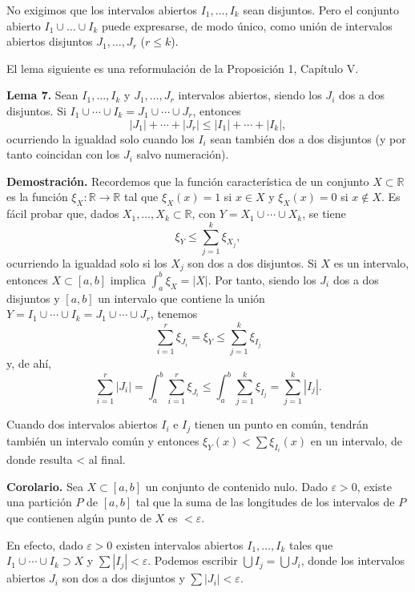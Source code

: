\documentclass[12pt,oneside]{book}
\begin{document}
No exigimos que los intervalos abiertos \(I_1, \dots, I_k\) sean disjuntos. Pero el conjunto abierto \(I_1 \cup \dots \cup I_k\) puede expresarse, de modo único, como unión de intervalos abiertos disjuntos \(J_1, \dots, J_r\) (\(r \le k\)).

El lema siguiente es una reformulación de la Proposición 1, Capítulo V.

\textbf{Lema 7.} Sean \(I_1, \ldots, I_k\) y \(J_1, \ldots, J_r\) intervalos abiertos, siendo los \(J_i\) dos a dos disjuntos. Si \(I_1 \cup \cdots \cup I_k = J_1 \cup \cdots \cup J_r\), entonces
\[
|J_1| + \cdots + |J_r| \leq |I_1| + \cdots + |I_k|,
\]
ocurriendo la igualdad solo cuando los \(I_i\) sean también dos a dos disjuntos (y por tanto coincidan con los \(J_i\) salvo numeración).

\textbf{Demostración.} Recordemos que la función característica de un conjunto \(X \subset \mathbb{R}\) es la función \(\xi_X: \mathbb{R} \to \mathbb{R}\) tal que \(\xi_X(x) = 1\) si \(x \in X\) y \(\xi_X(x) = 0\) si \(x \notin X\). Es fácil probar que, dados \(X_1, \ldots, X_k \subset \mathbb{R}\), con \(Y = X_1 \cup \cdots \cup X_k\), se tiene
\[
\xi_Y \leq \sum_{j=1}^k \xi_{X_j},
\]
ocurriendo la igualdad solo si los \(X_j\) son dos a dos disjuntos. Si \(X\) es un intervalo, entonces \(X \subset [a, b]\) implica \(\int_a^b \xi_X = |X|\). Por tanto, siendo los \(J_i\) dos a dos disjuntos y \([a, b]\) un intervalo que contiene la unión \(Y = I_1 \cup \cdots \cup I_k = J_1 \cup \cdots \cup J_r\), tenemos
\[
\sum_{i=1}^r \xi_{J_i} = \xi_Y \leq \sum_{j=1}^k \xi_{I_j}
\]
y, de ahí,
\[
\sum_{i=1}^r |J_i| = \int_a^b \sum_{i=1}^r \xi_{J_i}
\leq \int_a^b \sum_{j=1}^k \xi_{I_j}
= \sum_{j=1}^k |I_j|.
\]

Cuando dos intervalos abiertos \(I_i\) e \(I_j\) tienen un punto en común, tendrán también un intervalo común y entonces \(\xi_Y(x) < \sum \xi_{I_i}(x)\) en un intervalo, de donde resulta < al final.

\textbf{Corolario.} Sea \(X \subset [a, b]\) un conjunto de contenido nulo. Dado \(\varepsilon > 0\), existe una partición \(P\) de \([a, b]\) tal que la suma de las longitudes de los intervalos de \(P\) que contienen algún punto de \(X\) es \(< \varepsilon\).

En efecto, dado \(\varepsilon > 0\) existen intervalos abiertos \(I_1, \ldots, I_k\) tales que \(I_1 \cup \cdots \cup I_k \supset X\) y \(\sum |I_j| < \varepsilon\). Podemos escribir \(\bigcup I_j = \bigcup J_i\), donde los intervalos abiertos \(J_i\) son dos a dos disjuntos y \(\sum |J_i| < \varepsilon\).
\end{document}
